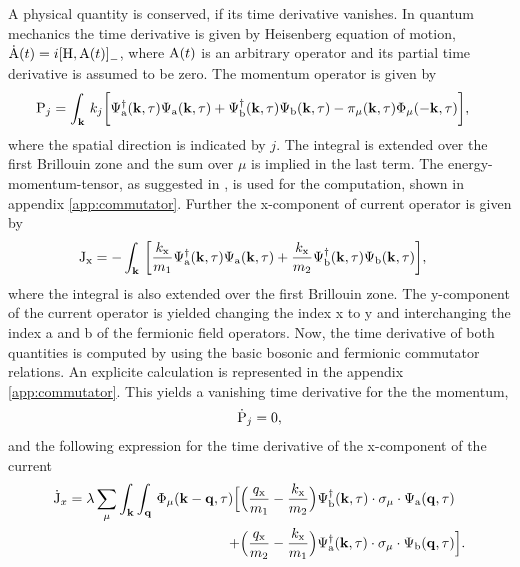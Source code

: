 A physical quantity is conserved, if its time derivative vanishes.
In quantum mechanics the time derivative is given by Heisenberg equation of motion, $\dot{\mt{A}}(t) = i\comm{\mt{H}}{\mt{A}(t)}_{-}$, where $\mathrm{A}(t)$ is an arbitrary operator and its partial time derivative is assumed to be zero.
The momentum operator is given by 
%
\begin{align}
	\mathrm{P}_{j} &= \int_{\vb{k}}\, 
		k_{j}\bigg[
	 		\Psi_{\mathrm{a}}^{\dag}(\vb{k},\tau) \Psi_{\mathrm{a}}(\vb{k},\tau)
	 		+
	 		\Psi_{\mathrm{b}}^{\dag}(\vb{k},\tau) \Psi_{\mathrm{b}}(\vb{k},\tau)
	 		-
	 		\pi_{\mu}(\vb{k},\tau) \Phi_{\mu}(-\vb{k},\tau)
		\bigg],
		\label{eq:momentum operator}
\end{align}
%
where the spatial direction is indicated by $j$.
The integral is extended over the first Brillouin zone and the sum over $\mu$ is implied in the last term.
The energy-momentum-tensor, as suggested in \cite{Iliev}, is used for the computation, shown in appendix \ref{app:commutator}.
Further the x-component of current operator is given by
%
\begin{align}
	\mathrm{J}_{\mathrm{x}} &= - \int_{\vb{k}}\, \bigg[
		\frac{k_{\mathrm{x}}}{m_{1}} \Psi_{\mathrm{a}}^{\dag}(\vb{k},\tau) \Psi_{\mathrm{a}}(\vb{k},\tau)
		+ 
		\frac{k_{\mathrm{x}}}{m_{2}} \Psi_{\mathrm{b}}^{\dag}(\vb{k},\tau) \Psi_{\mathrm{b}}(\vb{k},\tau)
	\bigg],
	\label{eq:current operator}
\end{align}
%
where the integral is also extended over the first Brillouin zone.
The y-component of the current operator is yielded changing the index x to y and interchanging the index a and b of the fermionic field operators.
Now, the time derivative of both quantities is computed by using the basic bosonic and fermionic commutator relations.
An explicite calculation is represented in the appendix \ref{app:commutator}.
This yields a vanishing time derivative for the the momentum,
%
\begin{align}
	\dot{\mathrm{P}}_{j} = 0,
	\label{eq:time derivative momentum}
\end{align}
%
and the following expression for the time derivative of the x-component of the current
%
\begin{align}
	\dot{\mathrm{J}}_{x} = \lambda
		\sum\limits_{\mu} \int_{\vb{k}} \int_{\vb{q}}\,
		\Phi_{\mu}(\vb{k}-\vb{q},\tau)
		\Big[
			&\Big(\frac{q_{\mathrm{x}}}{m_{1}} - \frac{k_{\mathrm{x}}}{m_{2}}\Big)
			\Psi_{\mathrm{b}}^{\dag}(\vb{k},\tau) \cdot \sigma_{\mu} \cdot \Psi_{\mathrm{a}}(\vb{q},\tau)
			\notag \\+
			&\Big(\frac{q_{\mathrm{x}}}{m_{2}} - \frac{k_{\mathrm{x}}}{m_{1}}\Big)
			\Psi_{\mathrm{a}}^{\dag}(\vb{k},\tau) \cdot \sigma_{\mu} \cdot \Psi_{\mathrm{b}}(\vb{q},\tau)
		\Big].
		\label{eq:time derivative current}
\end{align}
